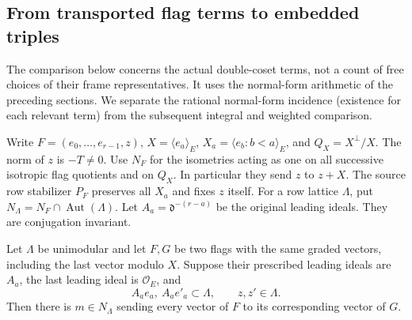 \subsection{From transported flag terms to embedded triples}
\label{sec:flag-term-correspondence}

The comparison below concerns the actual double-coset terms, not
a count of free choices of their frame representatives.  It uses the
normal-form arithmetic of the preceding sections.  We separate the
rational normal-form incidence (existence for each relevant term)
from the subsequent integral and weighted comparison.

Write \(F=(e_0,\ldots,e_{r-1},z)\), \(X=\langle e_a\rangle_E\),
\(X_a=\langle e_b:b<a\rangle_E\), and
\(Q_X=X^\perp/X\).  The norm of \(z\) is \(-T\ne0\).
Use \(N_F\) for the isometries acting as one on all successive
isotropic flag quotients and on \(Q_X\).  In particular they
send \(z\) to \(z+X\).  The source row stabilizer \(P_F\)
preserves all \(X_a\) and fixes \(z\) itself.
For a row lattice \(\Lambda\), put
\(N_\Lambda=N_F\cap\operatorname{Aut}(\Lambda)\).
Let \(A_a=\mathfrak d^{-(r-a)}\) be the original leading ideals.
They are conjugation invariant.

\begin{lemma}
\label{lem:integral-frame-movement}
Let \(\Lambda\) be unimodular and let \(F,G\) be two flags with
the same graded vectors, including the last vector modulo \(X\).
Suppose their prescribed leading ideals are \(A_a\), the last
leading ideal is \(\mathcal O_E\), and
\[
 A_a e_a,\ A_a e'_a\subset\Lambda,\qquad z,z'\in\Lambda .
\]
Then there is \(m\in N_\Lambda\) sending every vector of \(F\)
to its corresponding vector of \(G\).
\end{lemma}

